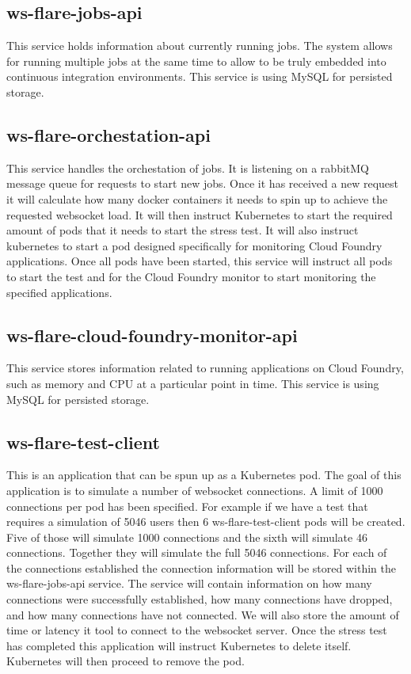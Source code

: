 \subsection{ws-flare-jobs-api}

This service holds information about currently running jobs. The system allows for running multiple jobs at the same time to allow to be truly embedded into continuous integration environments. This service is using MySQL for persisted storage. 

\subsection{ws-flare-orchestation-api}

This service handles the orchestation of jobs. It is listening on a rabbitMQ message queue for requests to start new jobs. Once it has received a new request it will calculate how many docker containers it needs to spin up to achieve the requested websocket load. It will then instruct Kubernetes to start the required amount of pods that it needs to start the stress test. It will also instruct kubernetes to start a pod designed specifically for monitoring Cloud Foundry applications. Once all pods have been started, this service will instruct all pods to start the test and for the Cloud Foundry monitor to start monitoring the specified applications.

\subsection{ws-flare-cloud-foundry-monitor-api}

This service stores information related to running applications on Cloud Foundry, such as memory and CPU at a particular point in time. This service is using MySQL for persisted storage. 

\subsection{ws-flare-test-client}

This is an application that can be spun up as a Kubernetes pod. The goal of this application is to simulate a number of websocket connections. A limit of 1000 connections per pod has been specified. For example if we have a test that requires a simulation of 5046 users then 6 ws-flare-test-client pods will be created. Five of those will simulate 1000 connections and the sixth will simulate 46 connections. Together they will simulate the full 5046 connections. For each of the connections established the connection information will be stored within the ws-flare-jobs-api service. The service will contain information on how many connections were successfully established, how many connections have dropped, and how many connections have not connected. We will also store the amount of time or latency it tool to connect to the websocket server. Once the stress test has completed this application will instruct Kubernetes to delete itself. Kubernetes will then proceed to remove the pod.

